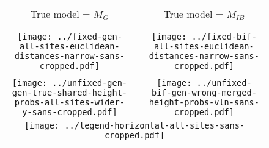 \documentclass[border=10pt,varwidth=30cm]{standalone}
\newcounter{subfloat}
\renewcommand{\thesubfloat}{\Alph{subfloat}}
\newcommand{\insertlabel}{%
    \Huge%
    \stepcounter{subfloat}%
    \textbf{\thesubfloat}}
\newcommand{\genmodel}{\ensuremath{M_{G}}\xspace}
\newcommand{\bimodel}{\ensuremath{M_{IB}}\xspace}
\begin{document}
\begin{figure}
    \setlength\arrayrulewidth{2pt}
    \centering
    \begin{tabular}{@{}ccc@{}}
        {\Huge True model = \genmodel}
        &
        &
        {\Huge True model = \bimodel}
        \\[2ex]
        \cline{1-1}\cline{3-3}
        & & \\
        \multicolumn{1}{l}{\insertlabel}
        &
        & 
        \multicolumn{1}{l}{\insertlabel} \\
        \texttt{[image: ../fixed-gen-all-sites-euclidean-distances-narrow-sans-cropped.pdf]}
        &
        &
        \texttt{[image: ../fixed-bif-all-sites-euclidean-distances-narrow-sans-cropped.pdf]}
        \\[2ex]
        \multicolumn{1}{l}{\insertlabel}
        &
        & 
        \multicolumn{1}{l}{\insertlabel} \\
        \texttt{[image: ../unfixed-gen-gen-true-shared-height-probs-all-sites-wider-y-sans-cropped.pdf]}
        &
        &
        \texttt{[image: ../unfixed-bif-gen-wrong-merged-height-probs-vln-sans-cropped.pdf]}
        \\[1ex]
        \hline
        \multicolumn{3}{|c|}{\texttt{[image: ../legend-horizontal-all-sites-sans-cropped.pdf]}} \\
        \hline
    \end{tabular}
\end{figure}
\end{document}
